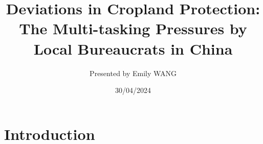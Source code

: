 \documentclass[10pt, xcolor=x11names,compress, aspectratio=169]{beamer}
\author{Presented by Emily WANG}
\title{Deviations in Cropland Protection: The Multi-tasking Pressures by Local Bureaucrats in China}
\institute{University of Tokyo}\date{30/04/2024}
\begin{document}
 \begin{frame}
 \titlepage
 \end{frame}

\section{Introduction}
\end{document}
